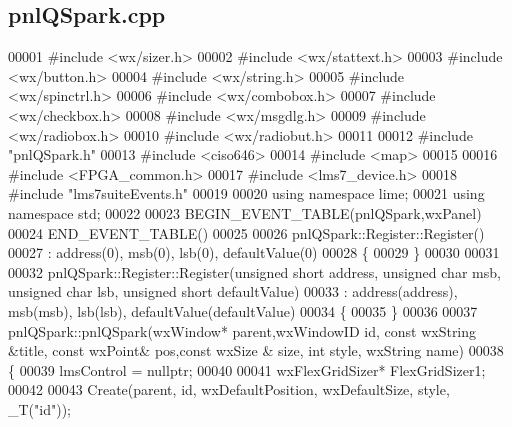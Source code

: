 \subsection{pnl\+Q\+Spark.\+cpp}
\label{pnlQSpark_8cpp_source}

\begin{DoxyCode}
00001 \textcolor{preprocessor}{#include <wx/sizer.h>}
00002 \textcolor{preprocessor}{#include <wx/stattext.h>}
00003 \textcolor{preprocessor}{#include <wx/button.h>}
00004 \textcolor{preprocessor}{#include <wx/string.h>}
00005 \textcolor{preprocessor}{#include <wx/spinctrl.h>}
00006 \textcolor{preprocessor}{#include <wx/combobox.h>}
00007 \textcolor{preprocessor}{#include <wx/checkbox.h>}
00008 \textcolor{preprocessor}{#include <wx/msgdlg.h>}
00009 \textcolor{preprocessor}{#include <wx/radiobox.h>}
00010 \textcolor{preprocessor}{#include <wx/radiobut.h>}
00011 
00012 \textcolor{preprocessor}{#include "pnlQSpark.h"}
00013 \textcolor{preprocessor}{#include <ciso646>}
00014 \textcolor{preprocessor}{#include <map>}
00015 
00016 \textcolor{preprocessor}{#include <FPGA_common.h>}
00017 \textcolor{preprocessor}{#include <lms7_device.h>}
00018 \textcolor{preprocessor}{#include "lms7suiteEvents.h"}
00019 
00020 \textcolor{keyword}{using namespace }lime;
00021 \textcolor{keyword}{using namespace }std;
00022 
00023 BEGIN\_EVENT\_TABLE(pnlQSpark,wxPanel)
00024 END\_EVENT\_TABLE()
00025 
00026 pnlQSpark::Register::Register()
00027     : address(0), msb(0), lsb(0), defaultValue(0)
00028 \{
00029 \}
00030 
00031 
00032 pnlQSpark::Register::Register(\textcolor{keywordtype}{unsigned} \textcolor{keywordtype}{short} address, \textcolor{keywordtype}{unsigned} \textcolor{keywordtype}{char} msb, \textcolor{keywordtype}{unsigned} \textcolor{keywordtype}{char} lsb, \textcolor{keywordtype}{unsigned} \textcolor{keywordtype}{short} 
      defaultValue)
00033     : address(address), msb(msb), lsb(lsb), defaultValue(defaultValue)
00034 \{
00035 \}
00036 
00037 pnlQSpark::pnlQSpark(wxWindow* parent,wxWindowID \textcolor{keywordtype}{id}, \textcolor{keyword}{const} wxString &title, \textcolor{keyword}{const} wxPoint& pos,\textcolor{keyword}{const} wxSize
      & size, \textcolor{keywordtype}{int} style, wxString name)
00038 \{
00039     lmsControl = \textcolor{keyword}{nullptr};
00040 
00041     wxFlexGridSizer* FlexGridSizer1;
00042 
00043     Create(parent, \textcolor{keywordtype}{id}, wxDefaultPosition, wxDefaultSize, style, \_T(\textcolor{stringliteral}{"id"}));

\end{DoxyCode}
